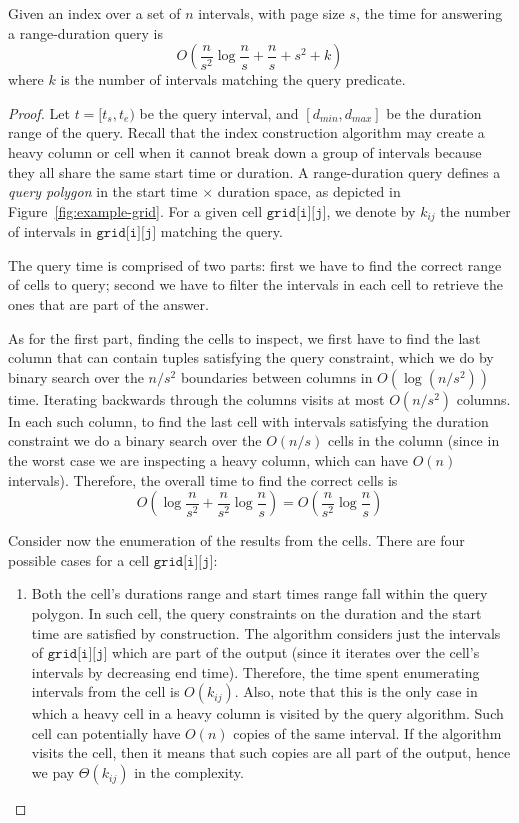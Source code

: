 \documentclass[sigconf,nonacm,anonymous]{acmart}
\theoremstyle{definition}
\newcommand{\BO}[1]{O\left(#1\right)}
\newcommand{\BT}[1]{\Theta\left(#1\right)}
\newcommand{\T}{\ensuremath{t}} %
\newcommand{\TS}{\ensuremath{t_s}}
\newcommand{\TE}{\ensuremath{t_e}}
\newcommand{\dmin}{\ensuremath{d_{min}}}
\newcommand{\dmax}{\ensuremath{d_{max}}}
\newcommand{\Gridij}{\texttt{grid[i][j]}\xspace}
\begin{document}
\begin{theorem}
	Given an index over a set of $n$ intervals, with page size $s$, the time for
	answering a range-duration query is
	\[
		\BO{\frac{n}{s^2}\log\frac{n}{s} + \frac{n}{s} + s^2 + k}
	\]
	where $k$ is the number of intervals matching the query predicate.
\end{theorem}
\begin{proof}
	Let $\T = [\TS, \TE)$ be the query interval, and $[\dmin, \dmax]$ be the duration range of the query.
	Recall that the index construction algorithm may create a heavy column or cell when it cannot break down a group of intervals
	because they all share the same start time or duration.
	A range-duration query defines a \emph{query polygon} in the start time $\times$ duration space, as depicted in Figure~\ref{fig:example-grid}.
	For a given cell $\Gridij$, we denote by $k_{ij}$ the number of intervals in $\Gridij$ matching the query.

  The query time is comprised of two parts: first we have to find  the correct
	range of cells to query; second we have to filter the intervals in each cell to retrieve
	the ones that are part of the answer.

  As for the first part, finding the cells to inspect, we first have to find the last column that can contain tuples satisfying the query constraint, which we do by binary search over the $n/s^2$ boundaries between columns in $\BO{\log (n/s^2)}$ time.
	Iterating backwards through the columns visits at most $\BO{n / s^2}$ columns.
	In each such column, to find the last cell with intervals satisfying the duration constraint
	we do a binary search over the $\BO{n/s}$ cells in the column
	(since in the worst case we are inspecting a heavy column, which can have $\BO{n}$ intervals).
	Therefore, the overall time to find the correct cells is
	\[
		\BO{\log\frac{n}{s^2} + \frac{n}{s^2} \log\frac{n}{s}} =
		\BO{\frac{n}{s^2} \log\frac{n}{s}}
	\]

	Consider now the enumeration of the results from the cells. There are four possible cases for a cell $\Gridij$:
	\begin{enumerate}
		\item Both the cell's durations range and start times range fall
		within the query polygon. In such cell, the query constraints on the
		duration and the start time are satisfied by construction. The
		algorithm considers just the intervals of $\Gridij$ which are part of
		the output (since it iterates over the cell's intervals by decreasing
		end time). Therefore, the time spent enumerating intervals from the
		cell is $\BO{k_{ij}}$.
		Also, note that this is the only case in which a heavy cell in a 
		heavy column is visited by the query algorithm. Such cell can potentially
		have $\BO{n}$ copies of the same interval. If the algorithm visits the cell, then
		it means that such copies are all part of the output, hence we pay 
		$\BT{k_{ij}}$ in the complexity.


\end{enumerate}
\end{proof}
\end{document}
